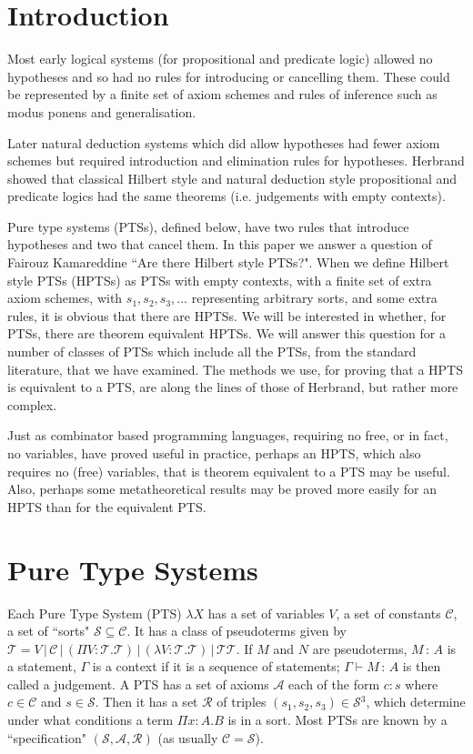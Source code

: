 \documentclass{LMCS}
\def\:{\mathbin{\,:\,}}
\begin{document}
\section*{Introduction}\label{S:one}

  \noindent Most early logical systems (for propositional and
  predicate logic) allowed no hypotheses and so had no rules for
  introducing or cancelling them.  These could be represented by a
  finite set of axiom schemes and rules of inference such as modus
  ponens and generalisation.

  Later natural deduction systems which did allow hypotheses had fewer
  axiom schemes but required introduction and elimination rules for
  hypotheses. Herbrand showed that classical Hilbert style and natural
  deduction style propositional and predicate logics had the same
  theorems (i.e. judgements with empty contexts).

  Pure type systems (PTSs), defined below, have two rules that
  introduce hypotheses and two that cancel them. In this paper we
  answer a question of Fairouz Kamareddine ``Are there Hilbert style
  PTSs?". When we define Hilbert style PTSs (HPTSs) as PTSs with empty
  contexts, with a finite set of extra axiom schemes, with $s_1, s_2,
  s_3,\dots $ representing arbitrary sorts, and some extra rules, it is
  obvious that there are HPTSs. We will be interested in whether, for
  PTSs, there are theorem equivalent HPTSs. We will answer this
  question for a number of classes of PTSs which include all the PTSs,
  from the standard literature, that we have examined. The methods we
  use, for proving that a HPTS is equivalent to a PTS, are along the
  lines of those of Herbrand, but rather more complex.

  Just as combinator based programming languages, requiring no free,
  or in fact, no variables, have proved useful in practice, perhaps an
  HPTS, which also requires no (free) variables, that is theorem
  equivalent to a PTS may be useful. Also, perhaps some
  metatheoretical results may be proved more easily for an HPTS than
  for the equivalent PTS.

\section{Pure Type Systems}\label{S:PTS}

  \noindent Each Pure Type System (PTS) $\lambda X$ has a set of
  variables $V$, a set of constants ${\mathcal C}$, a set of ``sorts"
  $\mathcal S\subseteq{\mathcal C}$. It has a class of pseudoterms
  given by ${\mathcal T}\!=\!V\,|\,{\mathcal C}\,|\,(\Pi
  V\!:\!\mathcal{T.T})\,|\,(\lambda V\!:\!\mathcal{T.T})\,|\,\mathcal{TT}$. If
  $M$ and $N$ are pseudoterms, $M\:A$ is a statement, $\Gamma$ is a
  context if it is a sequence of statements; $\Gamma\vdash M\:A$ is
  then called a judgement. A PTS has a set of axioms ${\mathcal A}$
  each of the form $c:s$ where $c\in{\mathcal C}$ and $s\in\mathcal
  S$. Then it has a set $\mathcal R$ of triples
  $(s_1,s_2,s_3)\in\mathcal {S}$$^3$, which determine under what
  conditions a term $\Pi x{:}A.B$ is in a sort.  Most PTSs are known
  by a ``specification" $(\mathcal S, {\mathcal A},\mathcal R)$ (as
  usually ${\mathcal C}=\mathcal S$).
\end{document}
